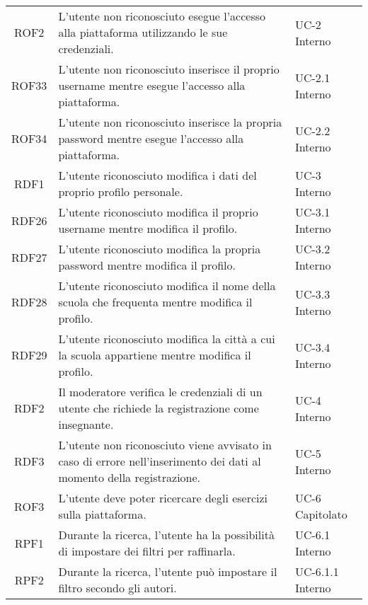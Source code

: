 \begin{tabularx}{\textwidth}{| c | p{10cm} | X |}
		ROF2 & L'utente non riconosciuto esegue l'accesso alla piattaforma utilizzando le sue credenziali. & UC-2 \newline Interno\\
		ROF33 & L'utente non riconosciuto inserisce il proprio username mentre esegue l'accesso alla piattaforma. & UC-2.1 \newline Interno\\
		ROF34 & L'utente non riconosciuto inserisce la propria password mentre esegue l'accesso alla piattaforma. & UC-2.2 \newline Interno\\
		RDF1 & L'utente riconosciuto modifica i dati del proprio profilo personale. & UC-3 \newline Interno\\
		RDF26 & L'utente riconosciuto modifica il proprio username mentre modifica il profilo. & UC-3.1 \newline Interno\\
		RDF27 & L'utente riconosciuto modifica la propria password mentre modifica il profilo. & UC-3.2 \newline Interno\\
		RDF28 & L'utente riconosciuto modifica il nome della scuola che frequenta mentre modifica il profilo. & UC-3.3 \newline Interno\\
		RDF29 & L'utente riconosciuto modifica la città a cui la scuola appartiene mentre modifica il profilo. & UC-3.4 \newline Interno\\
		RDF2 & Il moderatore verifica le credenziali di un utente che richiede la registrazione come insegnante. & UC-4 \newline Interno\\
		RDF3 & L'utente non riconosciuto viene avvisato in caso di errore nell'inserimento dei dati al momento della registrazione. & UC-5 \newline Interno\\
		ROF3 & L'utente deve poter ricercare degli esercizi sulla piattaforma. & UC-6 \newline Capitolato\\
		RPF1 & Durante la ricerca, l'utente ha la possibilità di impostare dei filtri per raffinarla. & UC-6.1 \newline Interno\\
		RPF2 & Durante la ricerca, l'utente può impostare il filtro secondo gli autori. & UC-6.1.1 \newline Interno\\

\end{tabularx}
